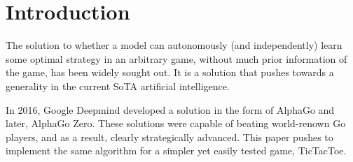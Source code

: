 \section{Introduction}
\label{sec:intro}

The solution to whether a model can autonomously (and independently) learn some optimal strategy in an arbitrary game, without much prior information of the game, has been widely sought out. It is a solution that pushes towards a generality in the current SoTA artificial intelligence. 

In 2016, Google Deepmind developed a solution in the form of AlphaGo and later, AlphaGo Zero. These solutions were capable of beating world-renown Go players, and as a result, clearly strategically advanced. This paper pushes to implement the same algorithm for a simpler yet easily tested game, TicTacToe. 







